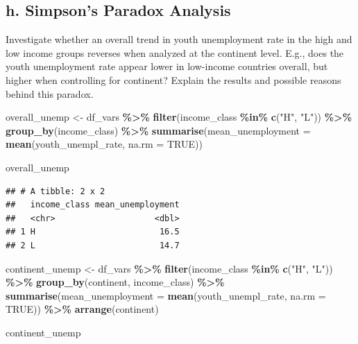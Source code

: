 \documentclass[
]{article}
\newenvironment{Shaded}{\begin{snugshade}}{\end{snugshade}}
\newcommand{\AttributeTok}[1]{\textcolor[rgb]{0.13,0.29,0.53}{#1}}
\newcommand{\ConstantTok}[1]{\textcolor[rgb]{0.56,0.35,0.01}{#1}}
\newcommand{\FunctionTok}[1]{\textcolor[rgb]{0.13,0.29,0.53}{\textbf{#1}}}
\newcommand{\NormalTok}[1]{#1}
\newcommand{\OtherTok}[1]{\textcolor[rgb]{0.56,0.35,0.01}{#1}}
\newcommand{\SpecialCharTok}[1]{\textcolor[rgb]{0.81,0.36,0.00}{\textbf{#1}}}
\newcommand{\StringTok}[1]{\textcolor[rgb]{0.31,0.60,0.02}{#1}}
\begin{document}
\subsection{h. Simpson's Paradox
Analysis}\label{h.-simpsons-paradox-analysis}

Investigate whether an overall trend in youth unemployment rate in the
high and low income groups reverses when analyzed at the continent
level. E.g., does the youth unemployment rate appear lower in low-income
countries overall, but higher when controlling for continent? Explain
the results and possible reasons behind this paradox.

\begin{Shaded}
\begin{Highlighting}[]
\NormalTok{overall\_unemp }\OtherTok{\textless{}{-}}\NormalTok{ df\_vars }\SpecialCharTok{\%\textgreater{}\%}
  \FunctionTok{filter}\NormalTok{(income\_class }\SpecialCharTok{\%in\%} \FunctionTok{c}\NormalTok{(}\StringTok{"H"}\NormalTok{, }\StringTok{"L"}\NormalTok{)) }\SpecialCharTok{\%\textgreater{}\%}
  \FunctionTok{group\_by}\NormalTok{(income\_class) }\SpecialCharTok{\%\textgreater{}\%}
  \FunctionTok{summarise}\NormalTok{(}\AttributeTok{mean\_unemployment =} \FunctionTok{mean}\NormalTok{(youth\_unempl\_rate, }\AttributeTok{na.rm =} \ConstantTok{TRUE}\NormalTok{))}

\NormalTok{overall\_unemp}
\end{Highlighting}
\end{Shaded}

\begin{verbatim}
## # A tibble: 2 x 2
##   income_class mean_unemployment
##   <chr>                    <dbl>
## 1 H                         16.5
## 2 L                         14.7
\end{verbatim}

\begin{Shaded}
\begin{Highlighting}[]
\NormalTok{continent\_unemp }\OtherTok{\textless{}{-}}\NormalTok{ df\_vars }\SpecialCharTok{\%\textgreater{}\%}
  \FunctionTok{filter}\NormalTok{(income\_class }\SpecialCharTok{\%in\%} \FunctionTok{c}\NormalTok{(}\StringTok{"H"}\NormalTok{, }\StringTok{"L"}\NormalTok{)) }\SpecialCharTok{\%\textgreater{}\%}
  \FunctionTok{group\_by}\NormalTok{(continent, income\_class) }\SpecialCharTok{\%\textgreater{}\%}
  \FunctionTok{summarise}\NormalTok{(}\AttributeTok{mean\_unemployment =} \FunctionTok{mean}\NormalTok{(youth\_unempl\_rate, }\AttributeTok{na.rm =} \ConstantTok{TRUE}\NormalTok{)) }\SpecialCharTok{\%\textgreater{}\%}
  \FunctionTok{arrange}\NormalTok{(continent)}

\NormalTok{continent\_unemp}
\end{Highlighting}
\end{Shaded}
\end{document}

